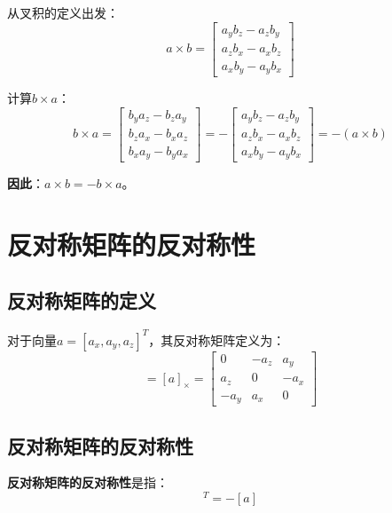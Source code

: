 \documentclass[12pt,a4paper]{article}
\begin{document}
从叉积的定义出发：
\begin{equation}
a \times b = \begin{bmatrix}
a_y b_z - a_z b_y \\
a_z b_x - a_x b_z \\
a_x b_y - a_y b_x
\end{bmatrix}
\end{equation}

计算$b \times a$：
\begin{equation}
b \times a = \begin{bmatrix}
b_y a_z - b_z a_y \\
b_z a_x - b_x a_z \\
b_x a_y - b_y a_x
\end{bmatrix} = -\begin{bmatrix}
a_y b_z - a_z b_y \\
a_z b_x - a_x b_z \\
a_x b_y - a_y b_x
\end{bmatrix} = -(a \times b)
\end{equation}

\textbf{因此}：$a \times b = -b \times a$。

\section{反对称矩阵的反对称性}

\subsection{反对称矩阵的定义}

对于向量$a = [a_x, a_y, a_z]^T$，其反对称矩阵定义为：
\begin{equation}
[a] = [a]_{\times} = \begin{bmatrix}
0 & -a_z & a_y \\
a_z & 0 & -a_x \\
-a_y & a_x & 0
\end{bmatrix}
\end{equation}

\subsection{反对称矩阵的反对称性}

\textbf{反对称矩阵的反对称性}是指：
\begin{equation}
[a]^T = -[a] \tag{2}
\end{equation}
\end{document}
